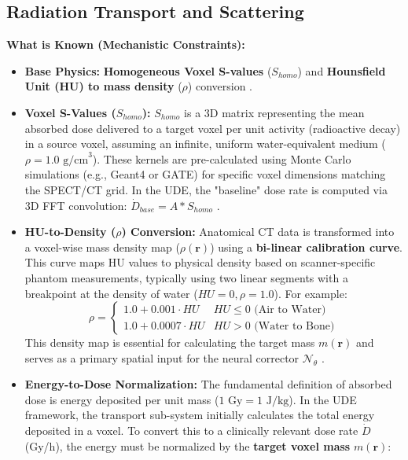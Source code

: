 \documentclass[11pt,a4paper]{article}
\begin{document}
\subsection{Radiation Transport and Scattering}
\textbf{What is Known (Mechanistic Constraints):}
\begin{itemize}
    \item \textbf{Base Physics:} \textbf{Homogeneous Voxel S-values} ($S_{homo}$) and \textbf{Hounsfield Unit (HU) to mass density} ($\rho$) conversion \cite{GtzSchmidkonz2019}.
    \item \textbf{Voxel S-Values ($S_{homo}$):} $S_{homo}$ is a 3D matrix representing the mean absorbed dose delivered to a target voxel per unit activity (radioactive decay) in a source voxel, assuming an infinite, uniform water-equivalent medium ($\rho = 1.0 \text{ g/cm}^3$). These kernels are pre-calculated using Monte Carlo simulations (e.g., Geant4 or GATE) for specific voxel dimensions matching the SPECT/CT grid. In the UDE, the "baseline" dose rate is computed via 3D FFT convolution: $\dot{D}_{base} = A \ast S_{homo}$ \cite{PistoneAuditore2022}.
    \item \textbf{HU-to-Density ($\rho$) Conversion:} Anatomical CT data is transformed into a voxel-wise mass density map ($\rho(\mathbf{r})$) using a \textbf{bi-linear calibration curve}. This curve maps HU values to physical density based on scanner-specific phantom measurements, typically using two linear segments with a breakpoint at the density of water ($HU=0, \rho=1.0$). For example:
    \begin{equation}
        \rho = \begin{cases} 1.0 + 0.001 \cdot HU & HU \leq 0 \text{ (Air to Water)} \\ 1.0 + 0.0007 \cdot HU & HU > 0 \text{ (Water to Bone)} \end{cases}
    \end{equation}
    This density map is essential for calculating the target mass $m(\mathbf{r})$ and serves as a primary spatial input for the neural corrector $\mathcal{N}_\theta$ \cite{GtzSchmidkonz2019, BaileyMarquis2022}.
    \item \textbf{Energy-to-Dose Normalization:} The fundamental definition of absorbed dose is energy deposited per unit mass ($1 \text{ Gy} = 1 \text{ J/kg}$). In the UDE framework, the transport sub-system initially calculates the total energy deposited in a voxel. To convert this to a clinically relevant dose rate $\dot{D}$ (Gy/h), the energy must be normalized by the \textbf{target voxel mass} $m(\mathbf{r})$:

\end{itemize}
\end{document}
